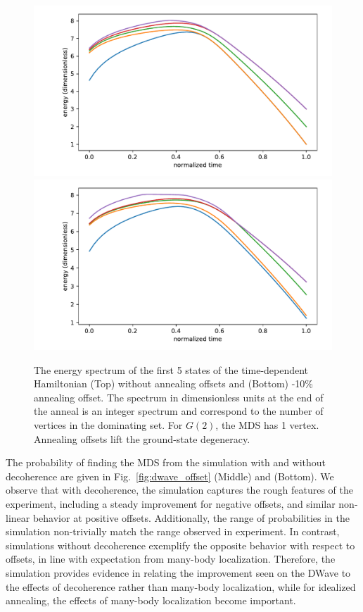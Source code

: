 \documentclass[prd,twocolumn,tightenlines,preprintnumbers,showpacs,superscriptaddress,notitlepage,nofootinbib,eqsecnum,floatfix,longbibliography]{revtex4}
\begin{document}
\begin{figure}
    \centering
    \includegraphics[width=\columnwidth]{./figures/spectrum.pdf}
    \includegraphics[width=\columnwidth]{./figures/spectrum_offset.pdf}
    \caption{The energy spectrum of the first 5 states of the time-dependent Hamiltonian (Top) without annealing offsets and (Bottom) -10\% annealing offset.
The spectrum in dimensionless units at the end of the anneal is an integer spectrum and correspond to the number of vertices in the dominating set.
For $G(2)$, the MDS has 1 vertex.
Annealing offsets lift the ground-state degeneracy.}
    \label{fig:spectrum}
\end{figure}

The probability of finding the MDS from the simulation with and without decoherence are given in Fig.~\ref{fig:dwave_offset} (Middle) and (Bottom).
We observe that with decoherence, the simulation captures the rough features of the experiment, including a steady improvement for negative offsets, and similar non-linear behavior at positive offsets.
Additionally, the range of probabilities in the simulation non-trivially match the range observed in experiment.
In contrast, simulations without decoherence exemplify the opposite behavior with respect to offsets, in line with expectation from many-body localization.
Therefore, the simulation provides evidence in relating the improvement seen on the DWave to the effects of decoherence rather than many-body localization, while for idealized annealing, the effects of many-body localization become important.
\end{document}
